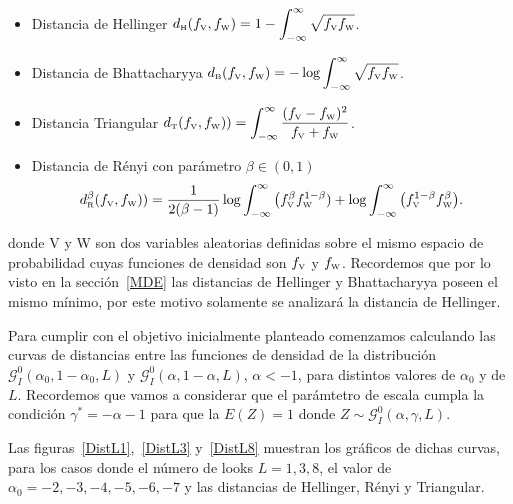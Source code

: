 \begin{itemize}
	\label{dist}
	\item Distancia de Hellinger $d_\text{\tiny H}(f_\text{\tiny V},f_\text{\tiny W})=1-\displaystyle{\int_{-\infty}^{\infty}\sqrt{f_\text{\tiny V} f_\text{\tiny W}}}$.
	
	\item Distancia de Bhattacharyya $d_\text{\tiny B}(f_\text{\tiny V},f_\text{\tiny W})=-\log\displaystyle{\int_{-\infty}^{\infty}\sqrt{f_\text{\tiny V} f_\text{\tiny W}}}$.
	
	\item Distancia Triangular $d_\text{\tiny T}(f_\text{\tiny V},f_\text{\tiny W}))=\displaystyle{\int_{-\infty}^{\infty}\frac{(f_\text{\tiny V}-f_\text{\tiny W})^2}{f_\text{\tiny V}+f_\text{\tiny W}}}$.
	
	\item Distancia de R\'enyi con parámetro $\beta\in(0,1)$
	$$
	d_\text{\tiny R}^{\beta}(f_\text{\tiny V},f_\text{\tiny W}))=\frac{1}{2(\beta-1)}\log\displaystyle{\int_{-\infty}^{\infty}\big({f_\text{\tiny V}^{\beta}f_\text{\tiny W}^{1-\beta})}+\log\displaystyle{\int_{-\infty}^{\infty}\big(f_\text{\tiny V}^{1-\beta}f_\text{\tiny W}^{\beta}}}\big).
	$$
\end{itemize}
donde V y W son  dos variables aleatorias definidas sobre el mismo espacio de probabilidad cuyas funciones de densidad son $f_\text{\tiny V}$ y $f_\text{\tiny W}$. 
Recordemos que por lo visto en la sección~\ref{MDE} las distancias de Hellinger y Bhattacharyya poseen el mismo mínimo, por este motivo solamente se analizará la distancia de Hellinger.  

Para cumplir con el objetivo inicialmente planteado comenzamos calculando las curvas de distancias entre las funciones de densidad de la distribución $\mathcal G_I^0(\alpha_0, 1-\alpha_0, L)$ y $\mathcal G_I^0(\alpha,1-\alpha,L)$, $\alpha<-1$, para distintos valores de $\alpha_0$ y de $L$. Recordemos que vamos a considerar que el parámtetro de escala cumpla la condición $\gamma^*=-\alpha-1$ para que la $E(Z)=1$ donde $Z \sim \mathcal{G}_I^0(\alpha,\gamma,L)$.

Las figuras~\ref{DistL1},~\ref{DistL3} y~\ref{DistL8} muestran los gráficos de dichas curvas, para los casos donde el número de looks $L=1,3,8$, el valor de $\alpha_0= -2,-3,-4,-5,-6,-7$ y las distancias de Hellinger, Rényi y Triangular. 

